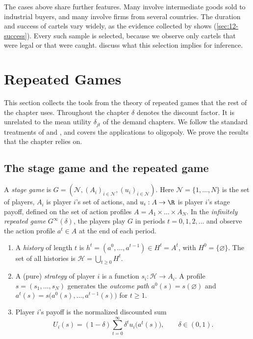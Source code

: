 The cases above share further features. Many involve intermediate goods sold to industrial buyers, and many involve
firms from several countries. The duration and success of cartels vary widely, as the evidence collected by
\citet{LevensteinSuslow2006} shows (\cref{sec:12-success}). Every such sample is selected, because we observe only
cartels that were legal or that were caught.  discuss what this
selection implies for inference.

\section{Repeated Games}\label{sec:12-repeated}

This section collects the tools from the theory of repeated games that the rest of the chapter uses. Throughout the
chapter $\delta$ denotes the discount factor. It is unrelated to the mean utility $\delta_{jt}$ of the demand
chapters. We follow the standard treatments of \citet{FudenbergTirole1991} and \citet{MailathSamuelson2006}, and
\citet[ch.~6]{Tirole1988} covers the applications to oligopoly. We prove the results that the chapter relies on.

\subsection{The stage game and the repeated game}\label{sec:12-setup}

\begin{definition}\label{def:12-repeated}
A \emph{stage game} is $G = (\mathcal N, (A_i)_{i \in \mathcal N}, (u_i)_{i \in \mathcal N})$. Here
$\mathcal N = \{1, \dots, N\}$ is the set of players, $A_i$ is player $i$'s set of actions, and
$u_i: A \to \R$ is player $i$'s stage payoff, defined on the set of action profiles
$A = A_1 \times \dots \times A_N$. In the \emph{infinitely repeated game} $G^\infty(\delta)$, the players play $G$ in
periods $t = 0, 1, 2, \dots$ and observe the action profile $a^t \in A$ at the end of each period.
\begin{enumerate}[label=(\roman*)]
\item A \emph{history} of length $t$ is $h^t = (a^0, \dots, a^{t-1}) \in H^t = A^t$, with $H^0 = \{\varnothing\}$.
  The set of all histories is $\mathcal H = \bigcup_{t \ge 0} H^t$.
\item A (pure) \emph{strategy} of player $i$ is a function $s_i: \mathcal H \to A_i$. A profile
  $s = (s_1, \dots, s_N)$ generates the \emph{outcome path} $a^0(s) = s(\varnothing)$ and
  $a^t(s) = s\bigl(a^0(s), \dots, a^{t-1}(s)\bigr)$ for $t \ge 1$.
\item Player $i$'s payoff is the normalized discounted sum
  \begin{equation}\label{eq:12-payoff}
  U_i(s) = (1 - \delta)\sum_{t=0}^{\infty}\delta^t u_i\bigl(a^t(s)\bigr), \qquad \delta \in (0, 1).
  \end{equation}
\end{enumerate}
\end{definition}

